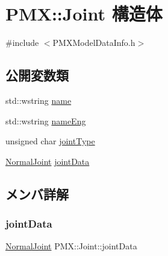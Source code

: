 \hypertarget{struct_p_m_x_1_1_joint}{}\section{P\+MX\+:\+:Joint 構造体}
\label{struct_p_m_x_1_1_joint}


{\ttfamily \#include $<$P\+M\+X\+Model\+Data\+Info.\+h$>$}

\subsection*{公開変数類}
\begin{DoxyCompactItemize}
\item 
std\+::wstring \mbox{\hyperlink{struct_p_m_x_1_1_joint_a3b3ceda09449db6455870510d678b279}{name}}
\item 
std\+::wstring \mbox{\hyperlink{struct_p_m_x_1_1_joint_ad9b219d5e9987000c69721aa1a753930}{name\+Eng}}
\item 
unsigned char \mbox{\hyperlink{struct_p_m_x_1_1_joint_a34df34f5e64c16c1df33523ec3a71992}{joint\+Type}}
\item 
\mbox{\hyperlink{struct_p_m_x_1_1_normal_joint}{Normal\+Joint}} \mbox{\hyperlink{struct_p_m_x_1_1_joint_ad1cedb585e982a62d84511003bf03971}{joint\+Data}}
\end{DoxyCompactItemize}


\subsection{メンバ詳解}
\mbox{\label{struct_p_m_x_1_1_joint_ad1cedb585e982a62d84511003bf03971}} 
\subsubsection{\texorpdfstring{joint\+Data}{jointData}}
{\footnotesize\ttfamily \mbox{\hyperlink{struct_p_m_x_1_1_normal_joint}{Normal\+Joint}} P\+M\+X\+::\+Joint\+::joint\+Data}

\mbox{\label{struct_p_m_x_1_1_joint_a34df34f5e64c16c1df33523ec3a71992}} 
